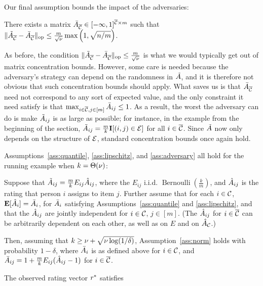 Our final assumption bounds the impact of the adversaries:
\begin{assumption}
\label{ass:adversary}
There exists a matrix $\bar{A}_{\overline{\mathcal{C}}} \in [-\infty,1]^{\overline{\mathcal{C}} \times m}$ such that 
$\|\tilde{A}_{\overline{\mathcal{C}}} - \bar{A}_{\overline{\mathcal{C}}}\|_{\mathrm{op}} \leq \frac{m}{\sqrt{\nu}}\max\left( 1, \sqrt{n/m} \right)$.
\end{assumption}

As before, the condition 
$\|\tilde{A}_{\overline{\mathcal{C}}} - \bar{A}_{\overline{\mathcal{C}}}\|_{\mathrm{op}} \leq \frac{m}{\sqrt{\nu}}$ is what 
we would typically get out of matrix concentration bounds.
However, some care is needed because the adversary's strategy can depend on 
the randomness in $\tilde{A}$, and it is therefore not obvious that such concentration 
bounds should apply. What saves us is that $\bar{A}_{\overline{\mathcal{C}}}$ need not correspond to 
any sort of expected value, and the only constraint it need satisfy is that 
$\max_{i \in \overline{\mathcal{C}}, j \in [m]} \bar{A}_{ij} \leq 1$. 
As a result, the worst the adversary can do is make $\tilde{A}_{ij}$ is as 
large as possible; for instance, in the example from the beginning of 
the section, $\tilde{A}_{ij} = \frac{m}{k}\mathbf{I}[(i,j) \in \mathcal{E}]$ for all $i \in \overline{\mathcal{C}}$.
Since $\tilde{A}$ now only depends on the structure of $\mathcal{E}$, standard concentration 
bounds once again hold.

Assumptions~\ref{ass:quantile}, \ref{ass:lipschitz}, and \ref{ass:adversary} 
all hold for the running example when $k = \Theta(\nu)$:
\begin{proposition}
Suppose that $\tilde{A}_{ij} = \frac{m}{k}E_{ij}\hat{A}_{ij}$, 
where the $E_{ij}$ i.i.d. $\operatorname{Bernoulli}(\frac{k}{m})$, and 
$\hat{A}_{ij}$ is the rating that person $i$ assigns to item $j$. Further 
assume that for each $i \in \mathcal{C}$, $\mathbf{E}[\hat{A}_{i}] = \bar{A}_i$, 
for $\bar{A}_i$ satisfying Assumptions~\ref{ass:quantile} and \ref{ass:lipschitz},
 and that the $\hat{A}_{ij}$ are jointly independent for 
$i \in \mathcal{C}$, $j \in [m]$. (The $\hat{A}_{ij}$ for $i \in \overline{\mathcal{C}}$ can be 
arbitrarily dependent on each other, as well as on $E$ and on 
$\hat{A}_{\mathcal{C}}$.)

%

Then, assuming that $k \geq \nu + \sqrt{\nu \log(1/\delta)}$, 
Assumption~\ref{ass:norm} holds with probability $1-\delta$, where $\bar{A}_i$ is 
as defined above for $i \in \mathcal{C}$, and 
$\bar{A}_{ij} = 1 + \frac{m}{k}E_{ij}(\hat{A}_{ij} - 1)$ for $i \in \overline{\mathcal{C}}$.
\end{proposition}


\begin{assumption}
\label{ass:r}
The observed rating vector $r^*$ satisfies 
\end{assumption}
